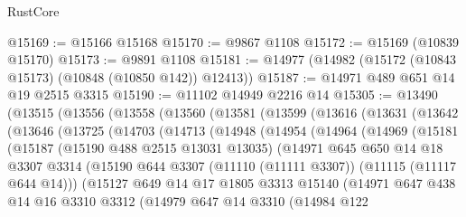 \begin{lexlean}{RustCore}
\begin{coremodule}
@15169 := @15166 @15168
@15170 := @9867 @1108
@15172 := @15169 (@10839 @15170)
@15173 := @9891 @1108
@15181 := @14977 (@14982 (@15172 (@10843 @15173) (@10848 (@10850 @142)) @12413))
@15187 := @14971 @489 @651 @14 @19 @2515 @3315
@15190 := @11102 @14949 @2216 @14
@15305 := @13490
    (@13515
      (@13556
        (@13558
          (@13560
            (@13581
              (@13599
                (@13616
                  (@13631
                    (@13642
                      (@13646
                        (@13725
                          (@14703
                            (@14713
                              (@14948
                                (@14954
                                  (@14964
                                    (@14969
                                      (@15181
                                        (@15187
                                          (@15190 @488 @2515 @13031 @13035)
                                          (@14971
                                            @645
                                            @650
                                            @14
                                            @18
                                            @3307
                                            @3314
                                            (@15190
                                              @644
                                              @3307
                                              (@11110 (@11111 @3307))
                                              (@11115 (@11117 @644 @14)))
                                            (@15127
                                              @649
                                              @14
                                              @17
                                              @1805
                                              @3313
                                              @15140
                                              (@14971
                                                @647
                                                @438
                                                @14
                                                @16
                                                @3310
                                                @3312
                                                (@14979
                                                  @647
                                                  @14
                                                  @3310
                                                  (@14984
                                                    @122

\end{coremodule}
\end{lexlean}
